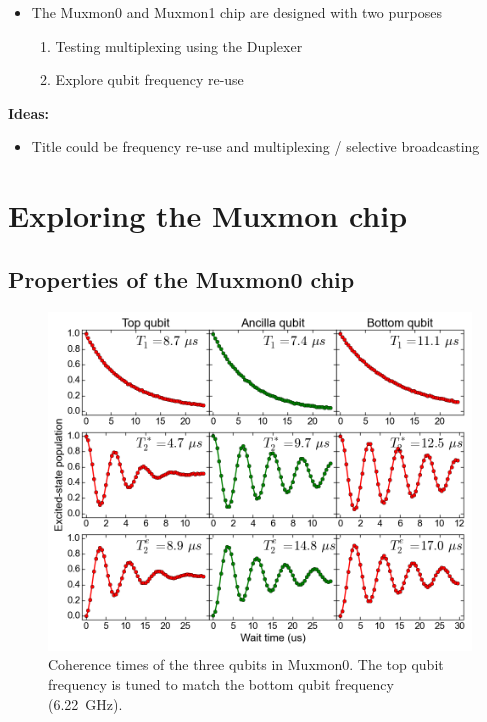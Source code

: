     \begin{itemize}
      \item The Muxmon0 and Muxmon1 chip are designed with two purposes
      \begin{enumerate}
        \item Testing multiplexing using the Duplexer
        \item Explore qubit frequency re-use
      \end{enumerate}
    \end{itemize}

    \textbf{Ideas:}
    \begin{itemize}
      \item Title could be frequency re-use and multiplexing / selective broadcasting
    \end{itemize}

  \chapter{Exploring the Muxmon chip}
    \section{Properties of the Muxmon0 chip}

      \begin{figure}[tb]
        \centering
        \includegraphics[width=\linewidth]{../Figures/Exploring frequency re-use/coherence_times.png}
        \caption{Coherence times of the three qubits in Muxmon0. The top qubit frequency is tuned to match the bottom qubit frequency (\SI{6.22}{\giga \hertz}).}
        \label{fig:coherence times Muxmon0}
      \end{figure}

